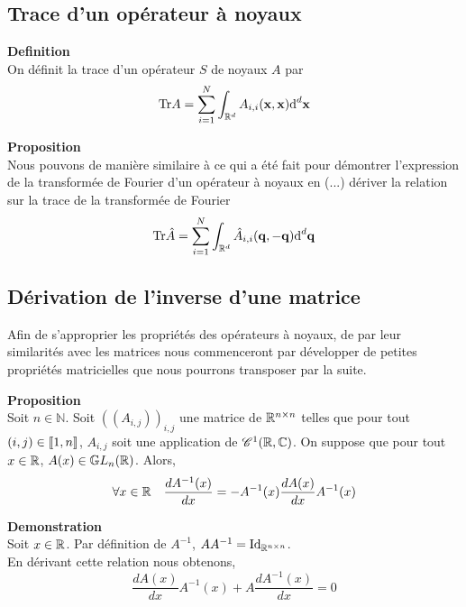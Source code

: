 \documentclass[10pt]{article}
\begin{document}
\vspace*{11pt}

\subsection{Trace d'un opérateur à noyaux}

\textbf{Definition}\\
On définit la trace d'un opérateur $S$ de noyaux $A$ par
\begin{equation}
  \text{Tr} A = \sum_{i=1}^{N} \int_{\mathbb{R}^d} A_{i,i}({\bf x},{\bf x}) \text{d}^d {\bf x} 
\end{equation}


\textbf{Proposition}\\
Nous pouvons de manière similaire à ce qui a été fait pour démontrer l'expression de la transformée de Fourier d'un opérateur à noyaux en (...) dériver la relation sur la trace de la transformée de Fourier
\begin{equation}
  \text{Tr} \hat{A} = \sum_{i=1}^{N} \int_{\mathbb{R}^d} \hat{A}_{i,i}({\bf q},-{\bf q}) \text{d}^d {\bf q} 
\end{equation}



\vspace*{11pt}



\subsection{Dérivation de l'inverse d'une matrice}

Afin de s'approprier les propriétés des opérateurs à noyaux, de par leur similarités avec les matrices nous commenceront par développer de petites propriétés matricielles que nous pourrons transposer par la suite.

\vspace*{11pt}

\textbf{Proposition} \\
Soit $ n \in \mathbb{N}$. Soit $((A_{i,j}))_{i,j}$ une matrice de $\mathbb{R}^{n \times n}$ telles que pour tout $(i,j) \in  \llbracket 1,n \rrbracket $, $A_{i,j}$ soit une application de $\mathscr{C}^1(\mathbb{R},\mathbb{C}) $. On suppose que pour tout $x \in \mathbb{R}$, $A(x) \in  \mathbb{G}L_n(\mathbb{R})$. Alors, 
\begin{equation}
  \forall x \in \mathbb{R} \quad \frac{dA^{-1}(x)}{dx} = - A^{-1}(x) \frac{dA(x)}{dx}A^{-1}(x)
\end{equation} 


\textbf{Demonstration}\\
Soit $x \in \mathbb{R}$.
Par définition de $A^{-1}$, $AA^{-1} = \text{Id}_{\mathbb{R}^{n\times n}}$.\\
En dérivant cette relation nous obtenons, 
\begin{equation}
  \frac{dA(x)}{dx}A^{-1}(x) + A\frac{dA^{-1}(x)}{dx} = 0
\end{equation}
\end{document}
